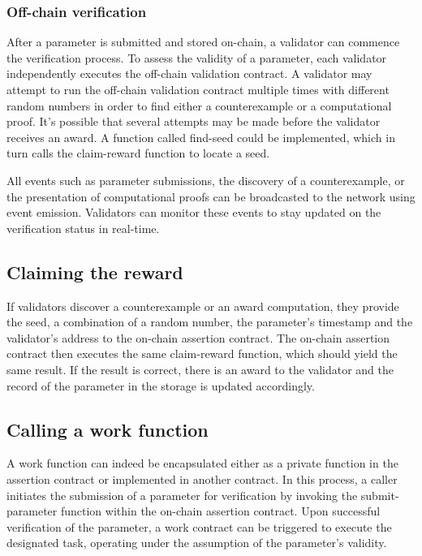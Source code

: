 \documentclass[runningheads]{llncs}
\begin{document}
\subsubsection{Off-chain verification}

After a parameter is submitted and stored on-chain, a validator can commence the verification process. To assess the validity of a parameter, each validator independently executes the off-chain validation contract. A validator may attempt to run the off-chain validation contract multiple times with different random numbers in order to find either a counterexample or a computational proof. It's possible that several attempts may be made before the validator receives an award.  A function called find-seed could be implemented, which in turn calls the claim-reward function to locate a seed.

All events such as parameter submissions, the discovery of a counterexample, or the presentation of computational proofs can be broadcasted to the network using event emission. Validators can monitor these events to stay updated on the verification status in real-time. 

\subsection{Claiming the reward} 
If validators discover a counterexample or an award computation, they provide the seed, a combination of a random number, the parameter's timestamp and the validator's address to the on-chain assertion contract. The on-chain assertion contract then executes the same claim-reward function, which should yield the same result.  If the result is correct, there is an award to the validator and the record of the parameter in the storage is updated accordingly. %


\subsection{Calling a work function}
A work function can indeed be encapsulated either as a private function in the assertion contract or implemented in another contract. In this process, a caller initiates the submission of a parameter for verification by invoking the submit-parameter function within the on-chain assertion contract. Upon successful verification of the parameter, a work contract can be triggered to execute the designated task, operating under the assumption of the parameter's validity.
\end{document}
